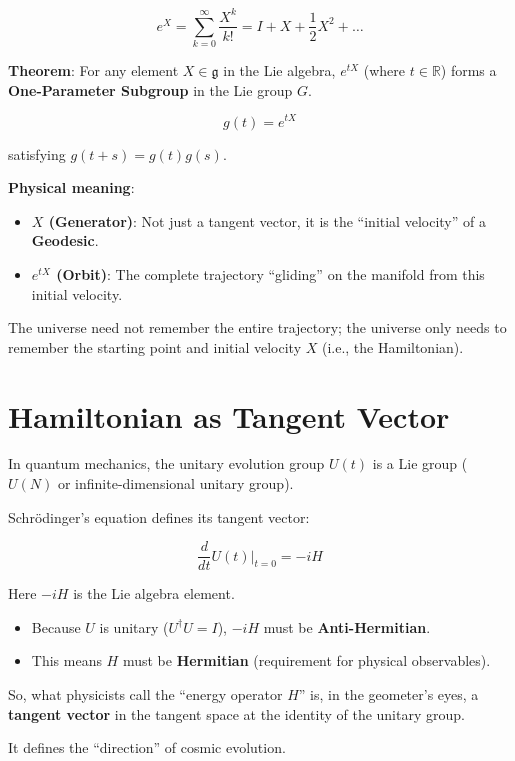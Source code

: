 \documentclass[11pt,a4paper,twoside]{book}
\begin{document}
$$e^X = \sum_{k=0}^{\infty} \frac{X^k}{k!} = I + X + \frac{1}{2}X^2 + \dots$$

\textbf{Theorem}: For any element $X \in \mathfrak{g}$ in the Lie algebra, $e^{tX}$ (where $t \in \mathbb{R}$) forms a \textbf{One-Parameter Subgroup} in the Lie group $G$.

$$g(t) = e^{tX}$$

satisfying $g(t+s) = g(t)g(s)$.

\textbf{Physical meaning}:

\begin{itemize}
\item \textbf{$X$ (Generator)}: Not just a tangent vector, it is the ``initial velocity'' of a \textbf{Geodesic}.

\item \textbf{$e^{tX}$ (Orbit)}: The complete trajectory ``gliding'' on the manifold from this initial velocity.
\end{itemize}

The universe need not remember the entire trajectory; the universe only needs to remember the starting point and initial velocity $X$ (i.e., the Hamiltonian).

\section{Hamiltonian as Tangent Vector}

In quantum mechanics, the unitary evolution group $U(t)$ is a Lie group ($U(N)$ or infinite-dimensional unitary group).

Schrödinger's equation defines its tangent vector:

$$\frac{d}{dt} U(t) \Big|_{t=0} = -iH$$

Here $-iH$ is the Lie algebra element.

\begin{itemize}
\item Because $U$ is unitary ($U^\dagger U = I$), $-iH$ must be \textbf{Anti-Hermitian}.

\item This means $H$ must be \textbf{Hermitian} (requirement for physical observables).
\end{itemize}

So, what physicists call the ``energy operator $H$'' is, in the geometer's eyes, a \textbf{tangent vector} in the tangent space at the identity of the unitary group.

It defines the ``direction'' of cosmic evolution.
\end{document}
